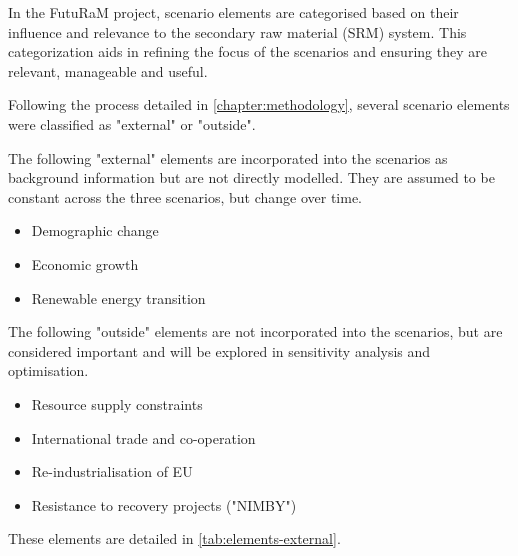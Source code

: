 In the FutuRaM project, scenario elements are categorised based on their influence and relevance to the secondary raw material (SRM) system. This categorization aids in refining the focus of the scenarios and ensuring they are relevant, manageable and useful.

Following the process detailed in \autoref{chapter:methodology}, several scenario elements were classified as "external" or "outside". 

The following "external" elements are incorporated into the scenarios as background information but are not directly modelled. They are assumed to be constant across the three scenarios, but change over time.

\begin{itemize}
    \item Demographic change 
    \item Economic growth  
    \item Renewable energy transition 
\end{itemize}

The following "outside" elements are not incorporated into the scenarios, but are considered important and will be explored in sensitivity analysis and optimisation.

\begin{itemize}
    \item Resource supply constraints 
    \item International trade and co-operation 
    \item Re-industrialisation of EU 
    \item Resistance to recovery projects ("NIMBY") 
\end{itemize}

These elements are detailed in \autoref{tab:elements-external}.

